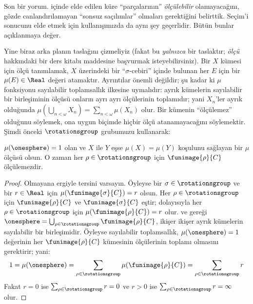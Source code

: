 Son bir yorum.  içinde elde edilen küre ``parçalarının''
\emph{ölçülebilir} olamayacağını, gözde canlandırılamayan ``sonsuz
saçılımlar'' olmaları gerektiğini belirttik. Seçim'i
 sonucunu elde etmek için kullanışımızda da aynı
şey geçerlidir. Bütün bunlar açıklanmaya değer.

Yine biraz arka planın taslağını çizmeliyiz (fakat bu \emph{yalnızca} bir
taslaktır; \emph{ölçü} hakkındaki bir ders kitabı maddesine başvurmak
isteyebilirsiniz). Bir $X$ kümesi için ölçü tanımlamak, $X$ üzerindeki bir
``$\sigma$-cebiri'' içinde bulunan her $E$ için bir
$\mu(E)\in\Real$ değeri atamaktır. Ayrıntılar önemli değildir; şu kadar ki
$\mu$ fonksiyonu sayılabilir toplamsallık ilkesine uymalıdır: ayrık
kümelerin sayılabilir bir birleşiminin ölçüsü onların ayrı ayrı ölçülerinin
toplamıdır; yani $X_n$'ler ayrık olduğunda
$\mu(\bigcup_{n < \omega} X_n) = \sum_{n < \omega}\mu(X_n)$ olur. Bir
kümenin ``ölçülemez'' olduğunu söylemek, ona uygun biçimde hiçbir ölçü
atanamayacağını söylemektir. Şimdi önceki $\rotationsgroup$ grubumuzu
kullanarak:

\begin{cor}[Vitali]
$\mu(\onesphere)=1$ olan ve $X$ ile $Y$ eşse
$\mu(X)=\mu(Y)$ koşulunu sağlayan bir $\mu$ ölçüsü olsun. O zaman her
$\rho\in\rotationsgroup$ için $\funimage{\rho}{C}$ ölçülemezdir.
\end{cor}

\begin{proof}
Olmayana ergiyle tersini varsayın. Öyleyse bir
$\sigma\in\rotationsgroup$ ve bir $r\in\Real$ için
$\mu(\funimage{\sigma}{C})=r$ olsun. Her
$\rho\in\rotationsgroup$ için $\funimage{\rho}{C}$ ve
$\funimage{\sigma}{C}$ eştir; dolayısıyla her
$\rho\in\rotationsgroup$ için $\mu(\funimage{\rho}{C})=r$ olur.
 ve  gereği
$\onesphere=\bigcup_{\rho\in\rotationsgroup}\funimage{\rho}{C}$,
ikişer ikişer ayrık kümelerin sayılabilir bir birleşimidir. Öyleyse
sayılabilir toplamsallık, $\mu(\onesphere)=1$ değerinin her
$\funimage{\rho}{C}$ kümesinin ölçülerinin toplamı olmasını gerektirir;
yani:
\[
	1 = \mu(\onesphere) = \sum_{\rho \in \rotationsgroup}\mu(\funimage{\rho}{C}) = \sum_{\rho \in \rotationsgroup}r
\]
Fakat $r=0$ ise $\sum_{\rho\in\rotationsgroup}r=0$ ve $r>0$ ise
$\sum_{\rho\in\rotationsgroup}r=\infty$ olur.
\end{proof}

